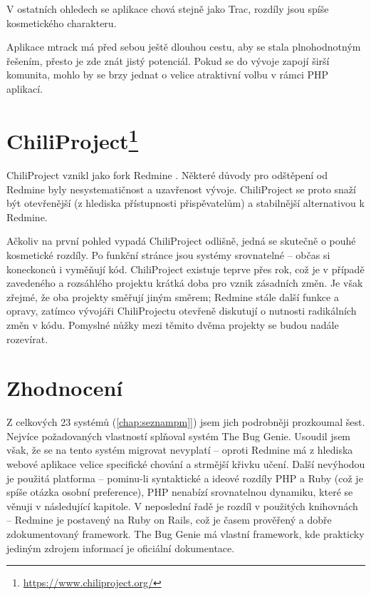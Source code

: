 \documentclass[thesis=B,czech]{FITthesis}[2012/05/02]
\begin{document}
V ostatních ohledech se aplikace chová stejně jako Trac, rozdíly jsou
spíše kosmetického charakteru.

Aplikace mtrack má před sebou ještě dlouhou cestu, aby se stala plnohodnotným
řešením, přesto je zde znát jistý potenciál. Pokud se do vývoje zapojí
širší komunita, mohlo by se brzy jednat o velice atraktivní volbu v
rámci PHP aplikací.

\section[ChiliProject]{ChiliProject\footnote{\url{https://www.chiliproject.org/}}}

ChiliProject vznikl jako \gls{fork} Redmine
\citep{ChiliProjectWhyFork}. Některé důvody pro odštěpení od Redmine
byly nesystematičnost a uzavřenost vývoje. ChiliProject se proto snaží
být otevřenější (z hlediska přístupnosti přispěvatelům) a stabilnější
alternativou k Redmine.

Ačkoliv na první pohled vypadá ChiliProject odlišně, jedná se skutečně
o pouhé kosmetické rozdíly. Po funkční stránce jsou systémy srovnatelné -- občas
si koneckonců i vyměňují kód. ChiliProject existuje teprve přes
rok, což je v případě zavedeného a rozsáhlého projektu krátká doba pro
vznik zásadních změn. Je však zřejmé, že oba projekty směřují jiným
směrem; Redmine stále  další funkce a opravy, zatímco
vývojáři ChiliProjectu otevřeně diskutují o nutnosti radikálních změn
v kódu. Pomyslné nůžky mezi těmito dvěma projekty se budou nadále
rozevírat.

\section{Zhodnocení}

Z celkových 23 systémů (\autoref{chap:seznampm}]) jsem jich podrobněji
prozkoumal šest. Nejvíce požadovaných vlastností splňoval systém The Bug
Genie. Usoudil jsem však, že se na tento systém migrovat nevyplatí --
oproti Redmine má z hlediska webové aplikace velice specifické chování a
strmější křivku učení. Další nevýhodou je použitá platforma -- pominu-li
syntaktické a ideové rozdíly PHP a Ruby (což je spíše otázka osobní
preference), PHP nenabízí srovnatelnou dynamiku, které se věnuji
v následující kapitole. V neposlední řadě je
rozdíl v použitých knihovnách -- Redmine je postavený na Ruby on Rails,
což je časem prověřený a dobře zdokumentovaný framework. The Bug Genie
má vlastní framework, kde prakticky jediným zdrojem informací je
oficiální dokumentace.
\end{document}
